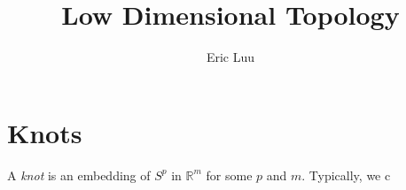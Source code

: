 \documentclass{article}
\title{Low Dimensional Topology}
\author{Eric Luu}
\theoremstyle{definition}
\numberwithin{theorem}{section}
\numberwithin{equation}{section}
\begin{document}
\section{Knots}
A \textit{knot} is an embedding of $S^p$ in $\mathbb{R}^m$ for some $p$ and $m$. Typically, we c
\end{document}
